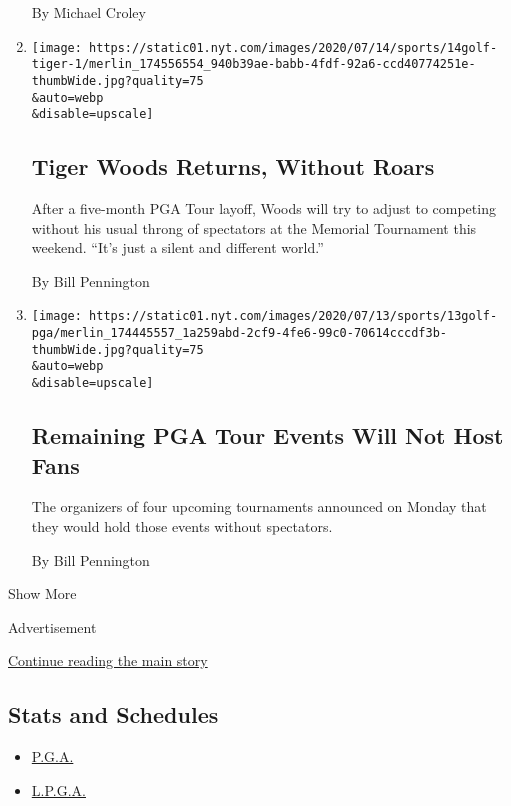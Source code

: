 \begin{enumerate}
  By Michael Croley
\item
  \href{/2020/07/14/sports/golf/tiger-woods-memorial-tournament.html}{}

  \texttt{[image: https://static01.nyt.com/images/2020/07/14/sports/14golf-tiger-1/merlin\_174556554\_940b39ae-babb-4fdf-92a6-ccd40774251e-thumbWide.jpg?quality=75\\\&auto=webp\\\&disable=upscale]}

  \hypertarget{tiger-woods-returns-without-roars}{%
  \subsection{Tiger Woods Returns, Without
  Roars}\label{tiger-woods-returns-without-roars}}

  After a five-month PGA Tour layoff, Woods will try to adjust to
  competing without his usual throng of spectators at the Memorial
  Tournament this weekend. ``It's just a silent and different world.''

  By Bill Pennington
\item
  \href{/2020/07/13/sports/golf/pga-tour-schedule-fans.html}{}

  \texttt{[image: https://static01.nyt.com/images/2020/07/13/sports/13golf-pga/merlin\_174445557\_1a259abd-2cf9-4fe6-99c0-70614cccdf3b-thumbWide.jpg?quality=75\\\&auto=webp\\\&disable=upscale]}

  \hypertarget{remaining-pga-tour-events-will-not-host-fans}{%
  \subsection{Remaining PGA Tour Events Will Not Host
  Fans}\label{remaining-pga-tour-events-will-not-host-fans}}

  The organizers of four upcoming tournaments announced on Monday that
  they would hold those events without spectators.

  By Bill Pennington
\end{enumerate}

Show More

Advertisement

\protect\hyperlink{after-mid1}{Continue reading the main story}

\hypertarget{stats-and-schedules}{%
\subsection{Stats and Schedules}\label{stats-and-schedules}}

\begin{itemize}
\tightlist
\item
  \protect\hyperlink{}{P.G.A.}
\item
  \protect\hyperlink{}{L.P.G.A.}
\end{itemize}

